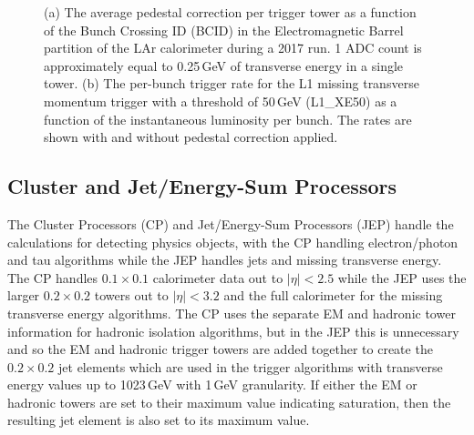 \begin{figure}[h!]
	\centering
	\hspace{0.1\textwidth}%
	\caption{(a) The average pedestal correction per trigger tower as a function of the Bunch Crossing ID (BCID) in the Electromagnetic Barrel partition of the LAr calorimeter during a 2017 run.  1 ADC count is approximately equal to 0.25\,GeV of transverse energy in a single tower.\cite{L1CaloPedestal} (b) The per-bunch trigger rate for the L1 missing transverse momentum trigger with a threshold of 50\,GeV (L1\_XE50) as a function of the instantaneous luminosity per bunch. The rates are shown with and without pedestal correction applied. \cite{L1Calo_Run2} 
	}
	\label{fig:Pedestal}
\end{figure} 

\subsection{Cluster and Jet/Energy-Sum Processors}

The Cluster Processors (CP) and Jet/Energy-Sum Processors (JEP) handle the calculations for detecting physics objects, with the CP handling electron/photon and tau algorithms while the JEP handles jets and missing transverse energy.  The CP handles $0.1\times0.1$ calorimeter data out to $|\eta|<2.5$ while the JEP uses the larger $0.2\times0.2$ towers out to $|\eta|<3.2$ and the full calorimeter for the missing transverse energy algorithms.  The CP uses the separate EM and hadronic tower information for hadronic isolation algorithms, but in the JEP this is unnecessary and so the EM and hadronic trigger towers are added together to create the $0.2\times0.2$ jet elements which are used in the trigger algorithms with transverse energy values up to 1023\,GeV with 1\,GeV granularity.  If either the EM or hadronic towers are set to their maximum value indicating saturation, then the resulting jet element is also set to its maximum value.

